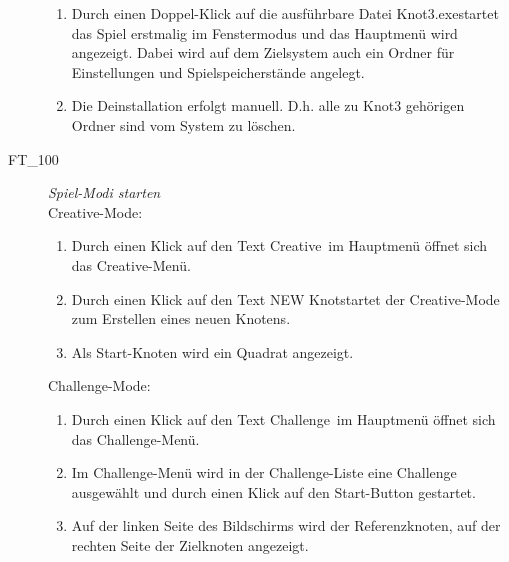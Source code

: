 \begin{description}
\begin{enumerate}
		\item Durch einen Doppel-Klick auf die ausführbare Datei \glqq Knot3.exe\grqq startet das Spiel erstmalig im Fenstermodus und das Hauptmenü wird angezeigt. Dabei wird auf dem Zielsystem auch ein Ordner für Einstellungen und Spielspeicherstände angelegt.
		
		\item Die Deinstallation erfolgt manuell. D.h. alle zu Knot3 gehörigen Ordner sind vom System zu löschen.
		~\\ 
	
	\end{enumerate}
	
	\item[FT\_100] \textit{Spiel-Modi starten} \hfill\\
	
	Creative-Mode:\\
	
	\begin{enumerate}
	
		\item Durch einen Klick auf den Text \glqq Creative\grqq~im Hauptmenü öffnet sich das Creative-Menü.
		
		\item Durch einen Klick auf den Text \glqq NEW Knot\glqq startet der Creative-Mode zum Erstellen eines neuen Knotens.
		
		\item Als Start-Knoten wird ein Quadrat angezeigt.
	
	\end{enumerate}
	
	Challenge-Mode:\\
	
	\begin{enumerate}
	
		\item Durch einen Klick auf den Text \glqq Challenge\grqq~im Hauptmenü öffnet sich das Challenge-Menü.
		
		\item Im Challenge-Menü wird in der Challenge-Liste eine Challenge ausgewählt und durch einen Klick auf den Start-Button gestartet.
		
		\item Auf der linken Seite des Bildschirms wird der Referenzknoten, auf der rechten Seite der Zielknoten angezeigt.
	
	\end{enumerate}
	~\\

	
\end{description}









